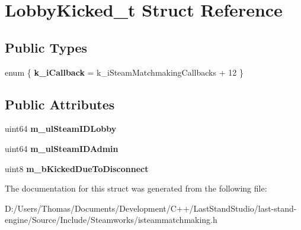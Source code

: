 \hypertarget{structLobbyKicked__t}{}\section{Lobby\+Kicked\+\_\+t Struct Reference}
\label{structLobbyKicked__t}
\subsection*{Public Types}
\begin{DoxyCompactItemize}
\item 
\hypertarget{structLobbyKicked__t_a52da22b9c571bb1bf72b03586ce40323}{}enum \{ {\bfseries k\+\_\+i\+Callback} = k\+\_\+i\+Steam\+Matchmaking\+Callbacks + 12
 \}\label{structLobbyKicked__t_a52da22b9c571bb1bf72b03586ce40323}

\end{DoxyCompactItemize}
\subsection*{Public Attributes}
\begin{DoxyCompactItemize}
\item 
\hypertarget{structLobbyKicked__t_a09b257bf4c78c5727896272d0b85c4be}{}uint64 {\bfseries m\+\_\+ul\+Steam\+I\+D\+Lobby}\label{structLobbyKicked__t_a09b257bf4c78c5727896272d0b85c4be}

\item 
\hypertarget{structLobbyKicked__t_a870067a701ca07a834709a3cf3e1c308}{}uint64 {\bfseries m\+\_\+ul\+Steam\+I\+D\+Admin}\label{structLobbyKicked__t_a870067a701ca07a834709a3cf3e1c308}

\item 
\hypertarget{structLobbyKicked__t_a3c55e0cc5de6f90ca6307c91e63fc78a}{}uint8 {\bfseries m\+\_\+b\+Kicked\+Due\+To\+Disconnect}\label{structLobbyKicked__t_a3c55e0cc5de6f90ca6307c91e63fc78a}

\end{DoxyCompactItemize}


The documentation for this struct was generated from the following file\+:\begin{DoxyCompactItemize}
\item 
D\+:/\+Users/\+Thomas/\+Documents/\+Development/\+C++/\+Last\+Stand\+Studio/last-\/stand-\/engine/\+Source/\+Include/\+Steamworks/isteammatchmaking.\+h\end{DoxyCompactItemize}
